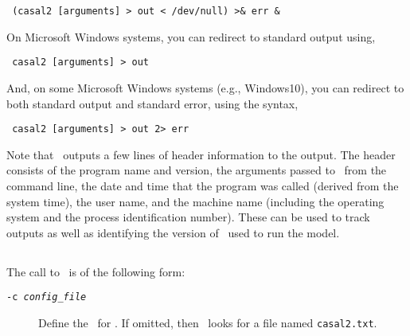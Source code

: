\begin{verbatim} (casal2 [arguments] > out < /dev/null) >& err &\end{verbatim}

On Microsoft Windows systems, you can redirect to standard output using,

\begin{verbatim} casal2 [arguments] > out\end{verbatim}

And, on some Microsoft Windows systems (e.g., Windows10), you can redirect to both standard output and standard error, using the syntax, 

\begin{verbatim} casal2 [arguments] > out 2> err\end{verbatim}

Note that \CNAME\ outputs a few lines of header information to the output. The header consists of the program name and version, the arguments passed to \CNAME\ from the command line, the date and time that the program was called (derived from the system time), the user name, and the machine name (including the operating system and the process identification number). These can be used to track outputs as well as identifying the version of \CNAME\ used to run the model.

\subsection{\label{sec:command-line-arguments}}

The call to \CNAME\ is of the following form: 

\texttt{}

\begin{description}
  \item [\texttt{-c \emph{config\_file}}] Define the \config\ for \CNAME. If omitted, then \CNAME\ looks for a file named \texttt{casal2.txt}.
\end{description}

